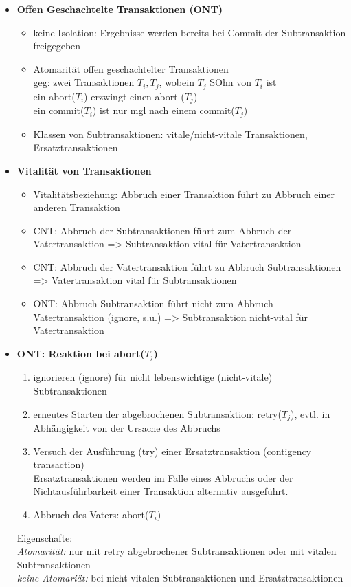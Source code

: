 \begin{itemize}
\begin{itemize}
		\item \textbf{Offen Geschachtelte Transaktionen (ONT)}
		\begin{itemize}
			\item keine Isolation: Ergebnisse werden bereits bei Commit der Subtransaktion freigegeben
			\item Atomarität offen geschachtelter Transaktionen\\
			geg: zwei Transaktionen $T_i, T_j$, wobein $T_j$ SOhn von $T_i$ ist\\
			ein abort($T_i$) erzwingt einen abort ($T_j$)\\
			ein commit($T_i$)  ist nur mgl nach einem commit($T_j$)
			
			\item Klassen von Subtransaktionen: vitale/nicht-vitale Transaktionen, Ersatztransaktionen
		\end{itemize}
		
		\item \textbf{Vitalität von Transaktionen}
		\begin{itemize}
			\item Vitalitätsbeziehung: Abbruch einer Transaktion führt zu Abbruch einer anderen Transaktion
			\item CNT: Abbruch der Subtransaktionen führt zum Abbruch der Vatertransaktion => Subtransaktion vital für Vatertransaktion
			\item CNT: Abbruch der Vatertransaktion führt zu Abbruch Subtransaktionen => Vatertransaktion vital für Subtransaktionen
			\item ONT: Abbruch Subtransaktion führt nicht zum Abbruch Vatertransaktion (ignore, s.u.) => Subtransaktion nicht-vital für Vatertransaktion
		\end{itemize}
		
		\item \textbf{ONT: Reaktion bei abort($T_j$)}
		\begin{enumerate}
			\item ignorieren (ignore) für nicht lebenswichtige (nicht-vitale) Subtransaktionen 
			\item erneutes Starten der abgebrochenen Subtransaktion: retry($T_j$), evtl. in Abhängigkeit von der Ursache des Abbruchs
			\item Versuch der Ausführung (try) einer Ersatztransaktion (contigency transaction)\\
			Ersatztransaktionen werden im Falle eines Abbruchs oder der Nichtausführbarkeit einer Transaktion alternativ ausgeführt.
			\item Abbruch des Vaters: abort($T_i$)
		\end{enumerate}
		Eigenschafte:\\
		\textit{Atomarität:} nur mit retry abgebrochener Subtransaktionen oder mit vitalen Subtransaktionen\\
		\textit{keine Atomariät:} bei nicht-vitalen Subtransaktionen und Ersatztransaktionen
		

\end{itemize}
\end{itemize}
